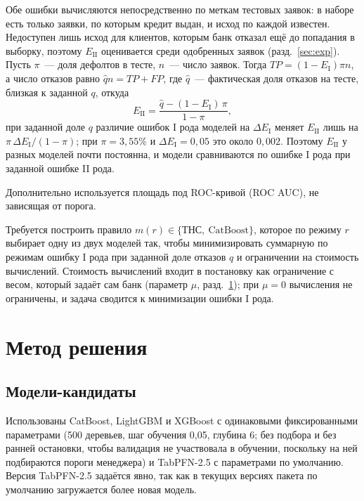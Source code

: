 \documentclass{misisarticle}
\begin{document}
Обе ошибки вычисляются непосредственно по меткам тестовых заявок: в наборе есть только заявки, по которым кредит выдан, и исход по каждой известен. Недоступен лишь исход для клиентов, которым банк отказал ещё до попадания в выборку, поэтому $E_{\mathrm{II}}$ оценивается среди одобренных заявок (разд.~\ref{sec:exp}). Пусть $\pi$~--- доля дефолтов в тесте, $n$~--- число заявок. Тогда $TP=(1-E_{\mathrm{I}})\pi n$, а число отказов равно $\hat q n=TP+FP$, где $\hat q$~--- фактическая доля отказов на тесте, близкая к заданной $q$, откуда
\begin{equation}
\label{eq:e2}
E_{\mathrm{II}}=\frac{\hat q-(1-E_{\mathrm{I}})\,\pi}{1-\pi},
\end{equation}
при заданной доле $q$ различие ошибок I рода моделей на $\Delta E_{\mathrm{I}}$ меняет $E_{\mathrm{II}}$ лишь на $\pi\,\Delta E_{\mathrm{I}}/(1-\pi)$; при $\pi=3{,}55\%$ и $\Delta E_{\mathrm{I}}=0{,}05$ это около $0{,}002$. Поэтому $E_{\mathrm{II}}$ у разных моделей почти постоянна, и модели сравниваются по ошибке I рода при заданной ошибке II рода.

Дополнительно используется площадь под ROC-кривой (ROC AUC), не зависящая от порога.

Требуется построить правило $m(r)\in\{\text{ТНС},\ \text{CatBoost}\}$, которое по режиму $r$ выбирает одну из двух моделей так, чтобы минимизировать суммарную по режимам ошибку I рода при заданной доле отказов $q$ и ограничении на стоимость вычислений. Стоимость вычислений входит в постановку как ограничение с весом, который задаёт сам банк (параметр $\mu$, разд.~\ref{sec:method}); при $\mu=0$ вычисления не ограничены, и задача сводится к минимизации ошибки I рода.

\section{Метод решения}
\label{sec:method}

\subsection{Модели-кандидаты}

Использованы CatBoost, LightGBM и XGBoost с одинаковыми фиксированными параметрами (500 деревьев, шаг обучения 0,05, глубина 6; без подбора и без ранней остановки, чтобы валидация не участвовала в обучении, поскольку на ней подбираются пороги менеджера) и TabPFN-2.5 с параметрами по умолчанию. Версия TabPFN-2.5 задаётся явно, так как в текущих версиях пакета по умолчанию загружается более новая модель.
\end{document}
